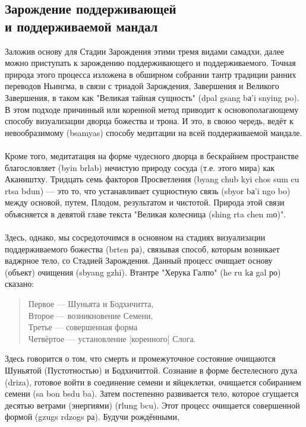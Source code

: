 \subsection{Зарождение поддерживающей \\ и поддерживаемой мандал}

Заложив основу для Стадии Зарождения этими тремя видами самадхи, далее можно
приступать к зарождению поддерживаю\-щего и поддерживаемого. Точная природа этого
процесса изложена в обширном собрании тантр традиции ранних переводов Ньингма, в связи
с триадой Зарождения, Заверше\-ния и Великого Завершения, в таком как "Великая тайная
сущность" (dpal gsang bа'i snying po). В этом подходе причинный или коренной метод
приводит к основополагаю\-щему способу визуализации дворца божества и трона. И это, в
своюо чередь, ведёт к невообразимому (bsamyas) способу медитации на всей
поддерживаемой мандале.\\
\\
Кроме того, медитатация на форме чудесного дворца в бескрайнем пространстве
благословляет (byin brlab) нечистую природу сосуда (т.е. этого мира) как Акаништху.
Тридцать семь факторов Просветления (byang chub kyi chos sum cu rtsa bdun) — это то, что
устанавливает сущностную связь (sbyor bа'i ngo bo) между основой, путем, Плодом,
результатом и чистотой. Природа этой связи объясняется в девятой главе текста
"Великая колесница (shing rta chen mо)".\\
\\
Здесь, однако, мы сосредоточимся в основном на стадиях визуализации поддерживаемого
божества (brten ра), связывая способ, которым возникает ваджрное тело, со Стадией
Зарож\-дения. Данный процесс очищает основу (объект) очищения (sbyang gzhi).
Втантре "Херука Галпо" (he ru kа gal ро) сказано:
\begin{verse}
Первое — Шуньята и Бодхичитта,\\
Второе — возникновение Семени,\\
Третье — совершенная форма\\
Четвёртое — установление [коренного] Слога.\\
\end{verse}
Здесь говорится о том, что смерть и промежуточное состояние очищаются Шуньятой
(Пустотностью) и Бодхичиттой. Сознание в форме бестелесного духа (driza), готовое войти
в соединение семени и яйцеклетки, очищается собиранием семени (sa bon bsdu ba). Затем
постепенно развивается тело, которое сгущается десятью ветрами (энергиями) (гlung bcu).
Этот процесс очищается совершенной формой (gzugs rdzogs ра). Будучи рождёнными,
